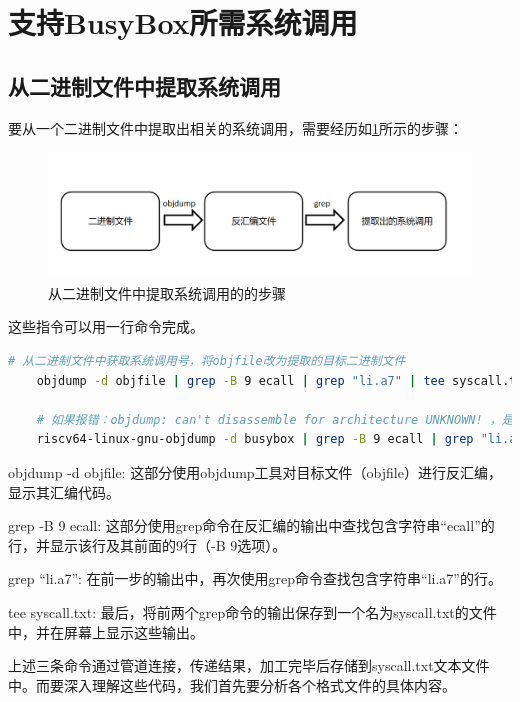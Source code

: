 \section{支持BusyBox所需系统调用}

\subsection{从二进制文件中提取系统调用}
要从一个二进制文件中提取出相关的系统调用，需要经历如\ref{fig:get syscall}所示的步骤：

\begin{figure}[htb]
    \centering
    \includegraphics[width=\textwidth]{figures/09-03-系统调用抽取.png}
    \caption{
        从二进制文件中提取系统调用的的步骤
    }
    \label{fig:get syscall}
\end{figure}

这些指令可以用一行命令完成。

\begin{lstlisting}[language=bash]
    # 从二进制文件中获取系统调用号，将objfile改为提取的目标二进制文件
    objdump -d objfile | grep -B 9 ecall | grep "li.a7" | tee syscall.txt

    # 如果报错：objdump: can't disassemble for architecture UNKNOWN! ，是由于当前的objdump并非RISC-V架构，尝试
    riscv64-linux-gnu-objdump -d busybox | grep -B 9 ecall | grep "li.a7" | tee syscall.txt

\end{lstlisting}

objdump -d objfile: 这部分使用objdump工具对目标文件（objfile）进行反汇编，显示其汇编代码。

grep -B 9 ecall: 这部分使用grep命令在反汇编的输出中查找包含字符串\enquote{ecall}的行，并显示该行及其前面的9行（-B 9选项）。

grep \enquote{li.a7}: 在前一步的输出中，再次使用grep命令查找包含字符串\enquote{li.a7}的行。

tee syscall.txt: 最后，将前两个grep命令的输出保存到一个名为syscall.txt的文件中，并在屏幕上显示这些输出。

上述三条命令通过管道连接，传递结果，加工完毕后存储到syscall.txt文本文件中。而要深入理解这些代码，我们首先要分析各个格式文件的具体内容。

